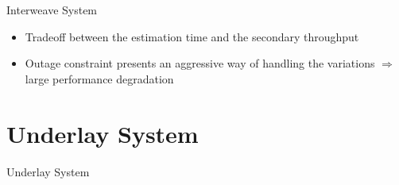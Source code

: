 \documentclass[16pt]{beamer}
\newif\ifunder
\begin{document}
\begin{frame}[t]{Interweave System}
\begin{block}{}
\begin{itemize}
			\item Tradeoff between the estimation time and the secondary throughput 
			\item Outage constraint presents an aggressive way of handling the variations $\Rightarrow$ large performance degradation 
		\end{itemize}		
	\end{block}	
\end{frame}

\fi

\ifunder

\section{Underlay System}
\begin{frame}[c]{}
\begin{center}
Underlay System
\end{center}
\end{frame}
\end{document}

